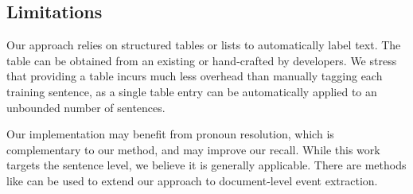 %

\subsection{Limitations}
Our approach relies on structured tables or lists to automatically label text. The table can be obtained from an existing \KB or
hand-crafted by developers. We stress that providing a table incurs much less overhead than manually tagging each training sentence, as a
single table entry can be automatically applied to an unbounded number of sentences.



Our implementation may benefit from pronoun resolution, %
which is complementary to our method, and may improve our recall.
While this work targets the sentence level, we believe it is generally applicable. There are methods like \FIXME{\cite{}} can be used to
extend our approach to document-level event extraction.
